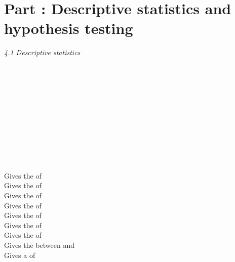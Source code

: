 \label{rhelppartfour}

\section{Part : Descriptive statistics and hypothesis testing}

\textit{4.1 Descriptive statistics} \\
\\
\begin{minipage}[t]{.4\textwidth}
\vspace*{-8pt}
 \\ 
 \\
 \\
 \\ 
 \\	
 \\
 \\
 \\
 \\
\end{minipage}
\begin{minipage}[t]{.6\textwidth}
Gives the  of  \\
Gives the  of  \\
Gives the  of  \\
Gives the  of  \\
Gives the  of  \\
Gives the  of  \\
Gives the  of  \\
Gives the  between  and  \\
Gives a  of   \\
\end{minipage}
\vspace*{.5cm}

